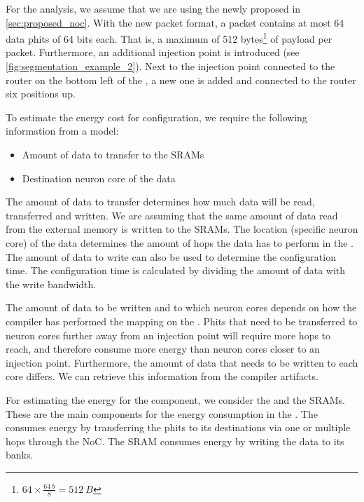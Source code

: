 For the analysis, we assume that we are using the newly proposed \confignoc{} in \cref{sec:proposed_noc}. 
With the new packet format, a packet contains at most 64 data phits of 64 bits each.
That is, a maximum of 512 bytes\footnote{$64 \times \frac{\SI{64}{b}}{8} = \SI{512}{B}$} of payload per packet.
Furthermore, an additional injection point is introduced (see \cref{fig:segmentation_example_2}).
Next to the injection point connected to the router on the bottom left of the \confignoc{}, a new one is added and connected to the router six positions up.

To estimate the energy cost for configuration, we require the following information from a model:
\begin{itemize}
    \item Amount of data to transfer to the SRAMs
    \item Destination neuron core of the data
\end{itemize}

The amount of data to transfer determines how much data will be read, transferred and written.
We are assuming that the same amount of data read from the external memory is written to the SRAMs.
The location (specific neuron core) of the data determines the amount of hops the data has to perform in the \confignoc{}.
The amount of data to write can also be used to determine the configuration time.
The configuration time is calculated by dividing the amount of data with the write bandwidth.

The amount of data to be written and to which neuron cores depends on how the compiler has performed the mapping on the \graicore{}. %
Phits that need to be transferred to neuron cores further away from an injection point will require more hops to reach, and therefore consume more energy than neuron cores closer to an injection point.
Furthermore, the amount of data that needs to be written to each core differs.
We can retrieve this information from the compiler artifacts.

For estimating the energy for the \graicore{} component, we consider the \confignoc{} and the SRAMs.
These are the main components for the energy consumption in the \graicore{}.
The \confignoc{} consumes energy by transferring the phits to its destinations via one or multiple hops through the NoC.
The SRAM consumes energy by writing the data to its banks.

